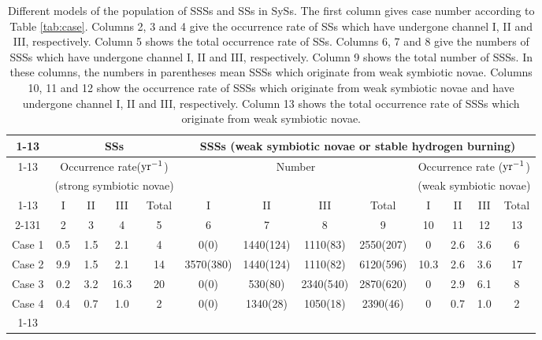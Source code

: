 \documentclass{elsart}
\begin{document}
\begin{table}
  \caption{Different models of the population of SSSs and SSs in
  SySs. The first column gives case number according to Table
  \ref{tab:case}. Columns 2, 3 and 4 give the occurrence rate of SSs which have undergone
  channel I, II and III, respectively. Column 5 shows the total occurrence rate of SSs.
  Columns 6, 7 and 8 give the numbers of SSSs which have undergone
  channel I, II and III, respectively. Column 9 shows the total number of SSSs. In these columns,
  the numbers in parentheses mean SSSs which originate from weak symbiotic novae.
  Columns 10, 11 and 12 show the occurrence rate of SSSs which originate
  from weak symbiotic novae and have undergone
  channel I, II and III, respectively. Column 13 shows the total occurrence rate of
  SSSs which originate from weak symbiotic novae.
           }
  \begin{center}
  \label{tab:result}
  \begin{tabular*}{200mm}{|c|c|c|c|c|c|c|c|c|c|c|c|c|}
\cline{1-13} \multicolumn{1}{|c|}{Cases}&\multicolumn{4}{|c|}{SSs
}&\multicolumn{8}{|c|}{SSSs
(weak symbiotic novae or stable hydrogen burning)}\\
\cline{1-13}\multicolumn{1}{|c|}{}&\multicolumn{4}{|c|}{Occurrence
rate($\rm yr^{-1}$)}
&\multicolumn{4}{|c|}{Number}&\multicolumn{4}{|c|}{Occurrence rate  ($\rm yr^{-1}$)}\\
\multicolumn{1}{|c|}{}&\multicolumn{4}{|c|}{(strong symbiotic
novae)}
&\multicolumn{4}{|c|}{}&\multicolumn{4}{|c|}{(weak symbiotic novae)}\\
\cline{1-13}\multicolumn{1}{|c|}{}
&\multicolumn{1}{|c|}{I}&\multicolumn{1}{|c|}{II}&\multicolumn{1}{|c|}{III}&\multicolumn{1}{|c|}{Total}&
\multicolumn{1}{|c|}{I}&\multicolumn{1}{|c|}{II}&\multicolumn{1}{|c|}{III}&\multicolumn{1}{|c|}{Total}
&\multicolumn{1}{|c|}{I}&\multicolumn{1}{|c|}{II}&\multicolumn{1}{|c|}{III}&\multicolumn{1}{|c|}{Total}\\
\cline{2-13}1&2&3&4&5&6&7&8&9       &10&11&12&13\\
Case 1&0.5&1.5&2.1&4   &0(0)&1440(124)&1110(83)&2550(207)&0&2.6&3.6&6\\
Case 2&9.9&1.5&2.1&14   &3570(380)&1440(124)&1110(82)&6120(596)&10.3&2.6&3.6&17\\
Case 3&0.2&3.2&16.3&20 &0(0)&530(80)&2340(540)&2870(620)&0&2.9&6.1&8\\
Case 4&0.4&0.7&1.0&2    &0(0)&1340(28)&1050(18)&2390(46)&0&0.7&1.0&2\\
\cline{1-13}

\end{tabular*}
\end{center}
\end{table}
\end{document}
